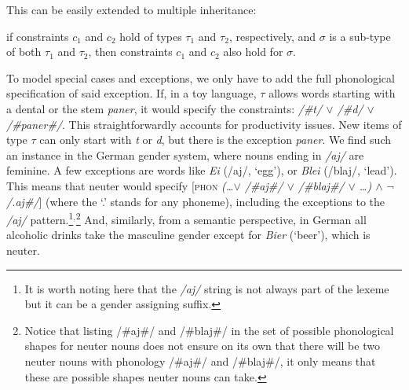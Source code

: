 This can be easily extended to multiple inheritance:

\begin{exe}
    \ex if constraints $c_1$ and $c_2$ hold of types $\tau_1$ and $\tau_2$, respectively, and $\sigma$ is a sub-type of both $\tau_1$ and $\tau_2$, then constraints $c_1$ and $c_2$ also hold for $\sigma$.
\end{exe}

To model special cases and exceptions, we only have to add the full phonological specification of said exception. If, in a toy language, $\tau$ allows words starting with a dental or the stem \textit{paner}, it would specify the constraints: \textit{/\#t/ $\lor$ /\#d/ $\lor$ /\#paner\#/}. This straightforwardly accounts for productivity issues. New items of type $\tau$ can only start with \textit{t} or \textit{d}, but there is the exception \textit{paner}. We find such an instance in the German gender system, where nouns ending in \textit{/aj/} are feminine. A few exceptions are words like \textit{Ei} (/aj/, `egg'), or \textit{Blei} (/blaj/, `lead'). This means that neuter would specify [\textsc{phon} \textit{(\dots  $\lor$ /\#aj\#/ $\lor$ /\#blaj\#/ $\lor$ \dots) $\land$ $\lnot$/.aj\#/}] (where the `.' stands for any phoneme), including the exceptions to the \textit{/aj/} pattern.\footnote{It is worth noting here that the \textit{/aj/} string is not always part of the lexeme but it can be a gender assigning suffix.}$^{,}$\footnote{Notice that listing /\#aj\#/ and /\#blaj\#/ in the set of possible phonological shapes for neuter nouns does not ensure on its own that there will be two neuter nouns with phonology /\#aj\#/ and /\#blaj\#/, it only means that these are possible shapes neuter nouns can take.} And, similarly, from a semantic perspective, in German all alcoholic drinks take the masculine gender except for \textit{Bier} (`beer'), which is neuter.

